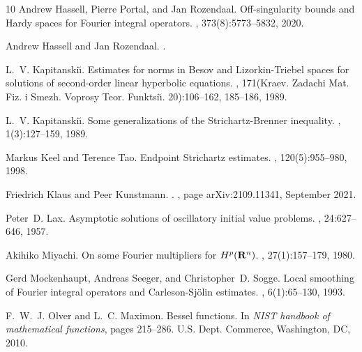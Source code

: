 \documentclass{amsart}
\theoremstyle{definition}
\numberwithin{equation}{section}
\begin{document}
\begin{thebibliography}{10}
Andrew Hassell, Pierre Portal, and Jan Rozendaal.
\newblock Off-singularity bounds and {H}ardy spaces for {F}ourier integral
  operators.
, 373(8):5773--5832, 2020.

Andrew {Hassell} and Jan {Rozendaal}.
.

L.~V. Kapitanski\u{\i}.
\newblock Estimates for norms in {B}esov and {L}izorkin-{T}riebel spaces for
  solutions of second-order linear hyperbolic equations.
,
  171(Kraev. Zadachi Mat. Fiz. i Smezh. Voprosy Teor. Funktsi\u{\i}.
  20):106--162, 185--186, 1989.

L.~V. Kapitanski\u{\i}.
\newblock Some generalizations of the {S}trichartz-{B}renner inequality.
, 1(3):127--159, 1989.

Markus Keel and Terence Tao.
\newblock Endpoint {S}trichartz estimates.
, 120(5):955--980, 1998.

Friedrich {Klaus} and Peer {Kunstmann}.
.
, page arXiv:2109.11341, September 2021.

Peter~D. Lax.
\newblock Asymptotic solutions of oscillatory initial value problems.
, 24:627--646, 1957.

Akihiko Miyachi.
\newblock On some {F}ourier multipliers for {$H\sp{p}({\bf R}\sp{n})$}.
, 27(1):157--179, 1980.

Gerd Mockenhaupt, Andreas Seeger, and Christopher~D. Sogge.
\newblock Local smoothing of {F}ourier integral operators and
  {C}arleson-{S}j\"{o}lin estimates.
, 6(1):65--130, 1993.

F.~W.~J. Olver and L.~C. Maximon.
\newblock Bessel functions.
\newblock In {\em N{IST} handbook of mathematical functions}, pages 215--286.
  U.S. Dept. Commerce, Washington, DC, 2010.


\end{thebibliography}
\end{document}
